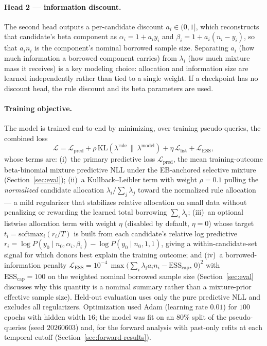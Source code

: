 \documentclass[11pt]{article}
\begin{document}
\paragraph{Head 2 --- information discount.} The second head outputs a
per-candidate discount $a_i \in (0,1]$, which reconstructs that candidate's beta
component as $\alpha_i = 1 + a_i y_i$ and $\beta_i = 1 + a_i(n_i - y_i)$, so
that $a_i n_i$ is the component's nominal borrowed sample size.
Separating $a_i$ (how much information a borrowed component carries) from
$\lambda_i$ (how much mixture mass it receives) is a key modeling choice:
allocation and information size are learned independently rather than tied to a
single weight. If a checkpoint has no discount head, the rule discount and its
beta parameters are used.

\paragraph{Training objective.} The model is trained end-to-end by minimizing,
over training pseudo-queries, the combined loss
\begin{equation}
\mathcal{L} = \mathcal{L}_{\mathrm{pred}}
+ \rho\,\mathrm{KL}(\lambda^{\mathrm{rule}}\,\|\,\lambda^{\mathrm{model}})
+ \eta\,\mathcal{L}_{\mathrm{list}}
+ \mathcal{L}_{\mathrm{ESS}},
\end{equation}
whose terms are: (i)~the primary predictive loss $\mathcal{L}_{\mathrm{pred}}$,
the mean training-outcome beta-binomial mixture predictive NLL under the
EB-anchored selective mixture (Section~\ref{sec:eval});
(ii)~a Kullback--Leibler term with weight $\rho = 0.1$ pulling the
\emph{normalized} candidate allocation $\lambda_i / \sum_j \lambda_j$ toward
the normalized rule allocation --- a mild regularizer that stabilizes relative
allocation on small data without penalizing or rewarding the learned total
borrowing $\sum_i \lambda_i$; (iii)~an optional
listwise allocation term with weight $\eta$ (disabled by default, $\eta = 0$)
whose target $t_i = \mathrm{softmax}_i(r_i/T)$ is built from each candidate's
relative log predictive
$r_i = \log P(y_0\mid n_0,\alpha_i,\beta_i) - \log P(y_0\mid n_0,1,1)$, giving a
within-candidate-set signal for which donors best explain the training outcome;
and (iv)~a borrowed-information penalty
$\mathcal{L}_{\mathrm{ESS}} = 10^{-4}\,\max\!\big(\sum_i \lambda_i a_i n_i - \mathrm{ESS_{cap}},\,0\big)^2$
with $\mathrm{ESS_{cap}} = 100$ on the weighted nominal borrowed sample size
(Section~\ref{sec:eval} discusses why this quantity is a nominal summary
rather than a mixture-prior effective sample size). Held-out evaluation uses
only the pure predictive NLL and excludes all regularizers. Optimization used
Adam (learning rate $0.01$) for $100$ epochs with hidden width $16$; the model
was fit on an $80\%$ split of the pseudo-queries (seed $20260603$) and, for the
forward analysis with past-only refits at each temporal
cutoff (Section~\ref{sec:forward-results}).
\end{document}

